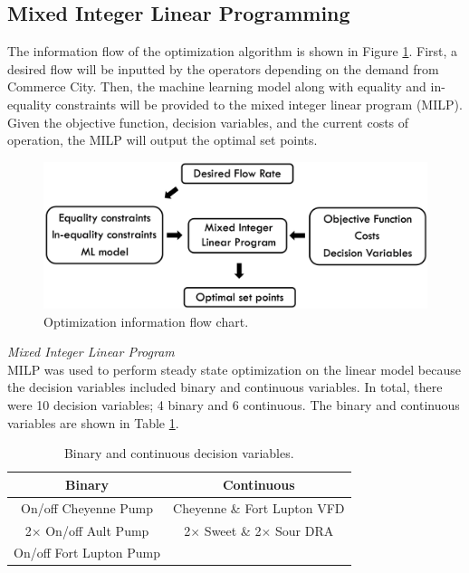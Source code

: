\subsection{Mixed Integer Linear Programming}
The information flow of the optimization algorithm is shown in Figure \ref{fig:08Optimization_flow}.  First, a desired flow will be inputted by the operators depending on the demand from Commerce City.  Then, the machine learning model along with equality and in-equality constraints will be provided to the mixed integer linear program (MILP).  Given the objective function, decision variables, and the current costs of operation, the MILP will output the optimal set points.
\begin{figure}[h]
    \centering
    \includegraphics[width=\textwidth]{images/08Optimization_flow.png}
    \caption{Optimization information flow chart.}
    \label{fig:08Optimization_flow}
\end{figure}

\noindent
\textit{Mixed Integer Linear Program} \\
MILP was used to perform steady state optimization on the linear model because the decision variables included binary and continuous variables.  In total, there were 10 decision variables; 4 binary and 6 continuous.  The binary and continuous variables are shown in Table \ref{tab:08binary_cont}.

\begin{table}[h]
    \centering
    {
    \begin{tabular}{ c | c }
        Binary                       &  Continuous           \\
        \hline
        On/off Cheyenne Pump               &  Cheyenne \& Fort Lupton VFD            \\
        2$\times$ On/off Ault Pump         &  2$\times$ Sweet \& 2$\times$ Sour DRA  \\
        On/off Fort Lupton Pump
    \end{tabular}}
    \caption{Binary and continuous decision variables.}
    \label{tab:08binary_cont}
\end{table}

